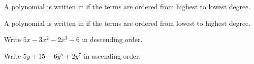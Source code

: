 \begin{definition}
\begin{itemize*}
\item A polynomial is written in  if the terms are ordered from highest to lowest degree.
\item A polynomial is written in  if the terms are ordered from lowest to highest degree.
\end{itemize*}
\end{definition}
\begin{Example}
Write $5x-3x^2-2x^3+6$ in descending order.\makeblanknewf
\end{Example}
\begin{Example}
Write $5y+15-6y^5+2y^7$ in ascending order.\makeblanknewf
\end{Example}